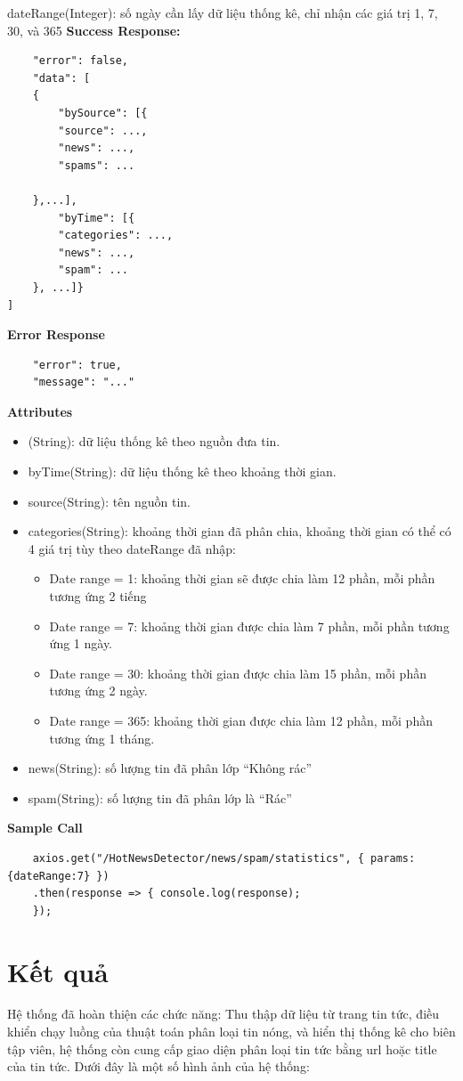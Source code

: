 dateRange(Integer): số ngày cần lấy dữ liệu thống kê, chỉ nhận các giá trị 1, 7, 30, và 365
\textbf{Success Response:}	
\begin{lstlisting}
	"error": false,
	"data": [
	{
		"bySource": [{
		"source": ...,
		"news": ...,
		"spams": ...
	
	},...],
		"byTime": [{
		"categories": ...,
		"news": ...,
		"spam": ...
	}, ...]}
]
\end{lstlisting}
\textbf{Error Response}
\begin{lstlisting}
	"error": true,		
	"message": "..."
\end{lstlisting}
\textbf{Attributes}
\begin{itemize}
	\item (String): dữ liệu thống kê theo nguồn đưa tin.
	\item byTime(String): dữ liệu thống kê theo khoảng thời gian.
	\item source(String): tên nguồn tin.
	\item categories(String): khoảng thời gian đã phân chia, khoảng thời gian có thể có 4 giá trị tùy theo dateRange đã nhập:
	\begin{itemize}
		\item Date range = 1: khoảng thời gian sẽ được chia làm 12 phần, mỗi phần tương ứng 2 tiếng
		\item 	Date range = 7: khoảng thời gian được chia làm 7 phần, mỗi phần tương ứng 1 ngày.
		\item 	Date range = 30: khoảng thời gian được chia làm 15 phần, mỗi phần tương ứng 2 ngày.
		\item 	Date range = 365: khoảng thời gian được chia làm 12 phần, mỗi phần tương ứng 1 tháng.
	\end{itemize}
	\item news(String): số lượng tin đã phân lớp “Không rác”
	\item spam(String): số lượng tin đã phân lớp là “Rác”
\end{itemize}	
\textbf{Sample Call}
\begin{lstlisting}
	axios.get("/HotNewsDetector/news/spam/statistics", { params:{dateRange:7} })
	.then(response => { console.log(response);
	}); 

\end{lstlisting}
\section{Kết quả}
Hệ thống đã hoàn thiện các chức năng: Thu thập dữ liệu từ trang tin tức, điều khiển chạy luồng của thuật toán phân loại tin nóng, và hiển thị thống kê cho biên tập viên, hệ thống còn cung cấp giao diện phân loại tin tức bằng url hoặc title của tin tức. Dưới đây là một số hình ảnh của hệ thống:

